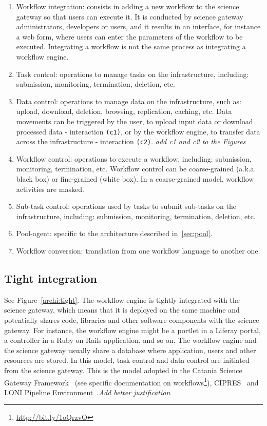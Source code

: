 \documentclass[preprint,3p,twocolumn]{elsarticle}
\newcommand{\todo}[1]{\color{blue}\xspace\emph{#1}\xspace\color{black}}
\begin{document}
\begin{enumerate}[leftmargin=0cm,itemindent=0.6cm,label=\texttt{(\alph*)}]

\item Workflow integration: consists in adding a new workflow to the
  science gateway so that users can execute it. It is conducted by
  science gateway administrators, developers or users, and it results
  in an interface, for instance a web form, where users can enter the
  parameters of the workflow to be executed. Integrating a workflow is
  not the same process as integrating a workflow engine.
\item Task control: operations to manage tasks on the infrastructure,
  including: submission, monitoring, termination, deletion, etc.
\item Data control: operations to manage data on
  the infrastructure, such as: upload, download, deletion, browsing,
  replication, caching, etc. Data movements can be triggered by the
  user, to upload input data or download processed data - interaction
  \texttt{(c1)}, or by the workflow engine, to transfer data across the
  infrastructure - interaction \texttt{(c2)}. \todo{add c1 and c2 to the
    Figures}
\item Workflow control: operations to execute a workflow, including:
  submission, monitoring, termination, etc. Workflow control can be
  coarse-grained (a.k.a. black box) or fine-grained (white box). In a
  coarse-grained model, workflow activities are masked. 
\item Sub-task control: operations used by tasks to submit sub-tasks
  on the infrastructure, including: submission, monitoring,
  termination, deletion, etc.
\item Pool-agent: specific to the architecture described in~\ref{sec:pool}.
\item Workflow conversion: translation from one workflow language to
  another one.
\end{enumerate}

\subsection{Tight integration}

See Figure~\ref{archi:tight}. The workflow engine is tightly
integrated with the science gateway, which means that it is deployed
on the same machine and potentially shares code, libraries and other
software components with the science gateway. For instance, the
workflow engine might be a portlet in a Liferay portal, a controller
in a Ruby on Rails application, and so on. The workflow engine and the
science gateway usually share a database where application, users and
other resources are stored. In this model, task control and data
control are initiated from the science gateway. This is the model
adopted in the Catania Science Gateway Framework~\cite{Ardizzone2012}
(see specific documentation on
workflows\footnote{\url{http://bit.ly/1oQrzvQ}}),
CIPRES~\cite{miller2010creating} and LONI Pipeline
Environment~\cite{dinov2009efficient}.\todo{Add better justification}
\end{document}
